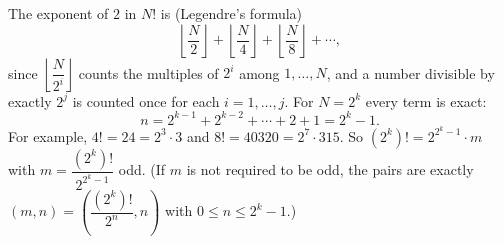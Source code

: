 The exponent of $2$ in $N!$ is (Legendre's formula)
\[
\left\lfloor\dfrac{N}{2}\right\rfloor+\left\lfloor\dfrac{N}{4}\right\rfloor+\left\lfloor\dfrac{N}{8}\right\rfloor+\cdots,
\]
since $\left\lfloor\dfrac{N}{2^i}\right\rfloor$ counts the multiples of $2^i$ among $1,\dots,N$, and a number divisible by exactly $2^j$ is counted once for each $i=1,\dots,j$. For $N=2^k$ every term is exact:
\[
n=2^{k-1}+2^{k-2}+\cdots+2+1=\boxed{2^k-1}.
\]
For example, $4!=24=2^3\cdot3$ and $8!=40320=2^7\cdot315$. So $(2^k)!=2^{2^k-1}\cdot m$ with $m=\dfrac{(2^k)!}{2^{2^k-1}}$ odd. (If $m$ is not required to be odd, the pairs are exactly $\left(m,n\right)=\left(\dfrac{(2^k)!}{2^n},n\right)$ with $0\le n\le2^k-1$.)
